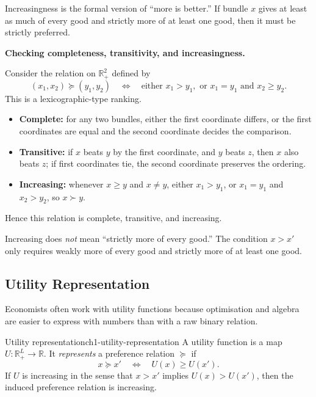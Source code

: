 Increasingness is the formal version of ``more is better.'' If bundle $x$ gives at least as much of every good and strictly more of at least one good, then it must be strictly preferred.

\begin{examplebox}
\textbf{Checking completeness, transitivity, and increasingness.}

Consider the relation on $\mathbb{R}^2_+$ defined by
\[
(x_1,x_2) \succeq (y_1,y_2)
\quad \Longleftrightarrow \quad
\text{either } x_1 > y_1, \text{ or } x_1 = y_1 \text{ and } x_2 \ge y_2.
\]
This is a lexicographic-type ranking.

\begin{itemize}
    \item \textbf{Complete:} for any two bundles, either the first coordinate differs, or the first coordinates are equal and the second coordinate decides the comparison.
    \item \textbf{Transitive:} if $x$ beats $y$ by the first coordinate, and $y$ beats $z$, then $x$ also beats $z$; if first coordinates tie, the second coordinate preserves the ordering.
    \item \textbf{Increasing:} whenever $x \ge y$ and $x \ne y$, either $x_1 > y_1$, or $x_1 = y_1$ and $x_2 > y_2$, so $x \succ y$.
\end{itemize}

Hence this relation is complete, transitive, and increasing.
\end{examplebox}

\begin{commonmistake}
Increasing does \emph{not} mean ``strictly more of every good.'' The condition $x > x'$ only requires weakly more of every good and strictly more of at least one good.
\end{commonmistake}

\subsection{Utility Representation}

Economists often work with utility functions because optimisation and algebra are easier to express with numbers than with a raw binary relation.

\begin{definition}{Utility representation}{ch1-utility-representation}
A utility function is a map $U : \mathbb{R}^L_+ \to \mathbb{R}$. It \emph{represents} a preference relation $\succeq$ if
\[
x \succeq x' \quad \Longleftrightarrow \quad U(x) \ge U(x').
\]
If $U$ is increasing in the sense that $x > x'$ implies $U(x) > U(x')$, then the induced preference relation is increasing.
\end{definition}

